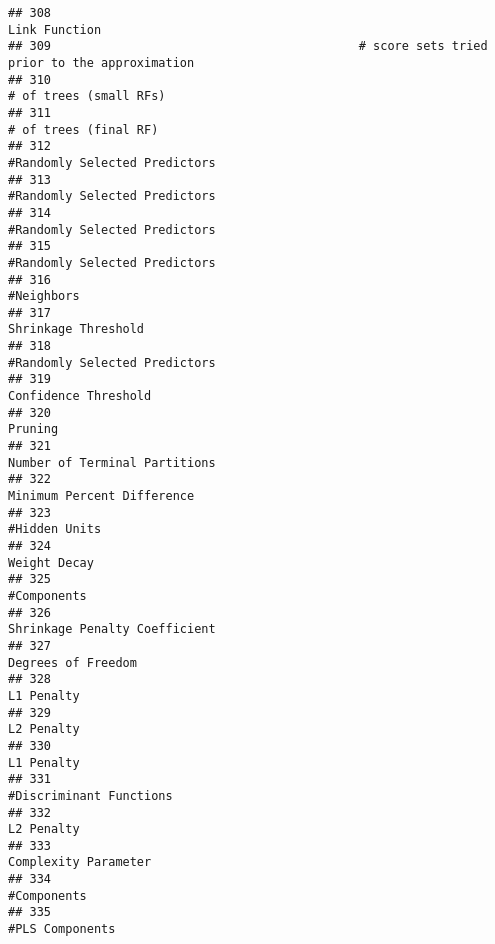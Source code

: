 \documentclass[
]{article}
\begin{document}
\begin{verbatim}
## 308                                                                           Link Function
## 309                                           # score sets tried prior to the approximation
## 310                                                                  # of trees (small RFs)
## 311                                                                   # of trees (final RF)
## 312                                                           #Randomly Selected Predictors
## 313                                                           #Randomly Selected Predictors
## 314                                                           #Randomly Selected Predictors
## 315                                                           #Randomly Selected Predictors
## 316                                                                              #Neighbors
## 317                                                                     Shrinkage Threshold
## 318                                                           #Randomly Selected Predictors
## 319                                                                    Confidence Threshold
## 320                                                                                 Pruning
## 321                                                           Number of Terminal Partitions
## 322                                                              Minimum Percent Difference
## 323                                                                           #Hidden Units
## 324                                                                            Weight Decay
## 325                                                                             #Components
## 326                                                           Shrinkage Penalty Coefficient
## 327                                                                      Degrees of Freedom
## 328                                                                              L1 Penalty
## 329                                                                              L2 Penalty
## 330                                                                              L1 Penalty
## 331                                                                 #Discriminant Functions
## 332                                                                              L2 Penalty
## 333                                                                    Complexity Parameter
## 334                                                                             #Components
## 335                                                                         #PLS Components

\end{verbatim}
\end{document}
